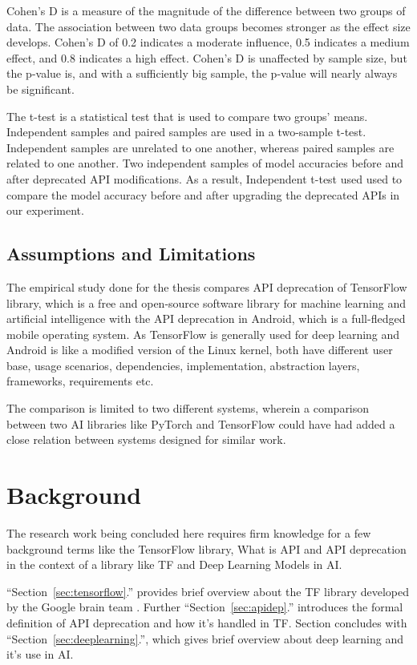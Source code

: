 \documentclass[12pt,letterpaper]{report}
\begin{document}
Cohen's D is a measure of the magnitude of the difference between two groups of data. The association between two data groups becomes stronger as the effect size develops. Cohen's D of 0.2 indicates a moderate influence, 0.5 indicates a medium effect, and 0.8 indicates a high effect. Cohen's D is unaffected by sample size, but the p-value is, and with a sufficiently big sample, the p-value will nearly always be significant. 

The t-test is a statistical test that is used to compare two groups' means. Independent samples and paired samples are used in a two-sample t-test. Independent samples are unrelated to one another, whereas paired samples are related to one another. Two independent samples of model accuracies before and after deprecated API modifications. As a result, Independent t-test used used to compare the model accuracy before and after upgrading the deprecated APIs in our experiment.

\section{Assumptions and Limitations} \label{sec:assumptions}

The empirical study done for the thesis compares API deprecation of TensorFlow library, which is a free and open-source software library for machine learning and artificial intelligence with the API deprecation in Android, which is a full-fledged mobile operating system. As TensorFlow is generally used for deep learning and Android is like a modified version of the Linux kernel, both have different user base, usage scenarios, dependencies, implementation, abstraction layers, frameworks, requirements etc.

The comparison is limited to two different systems, wherein a comparison between two AI libraries like PyTorch and TensorFlow could have had added a close relation between systems designed for similar work.

\chapter{Background}

The research work being concluded here requires firm knowledge for a few background terms like the TensorFlow library, What is API and API deprecation in the context of a library like TF and Deep Learning Models in AI.

``Section~\ref{sec:tensorflow}.'' provides brief overview about the TF library developed by the Google brain team \cite{GoogleBrain,DLwithTensor}. Further ``Section~\ref{sec:apidep}.'' introduces the formal definition of API deprecation and how it's handled in TF. Section concludes with ``Section~\ref{sec:deeplearning}.'', which gives brief overview about deep learning and it's use in AI.
\end{document}

